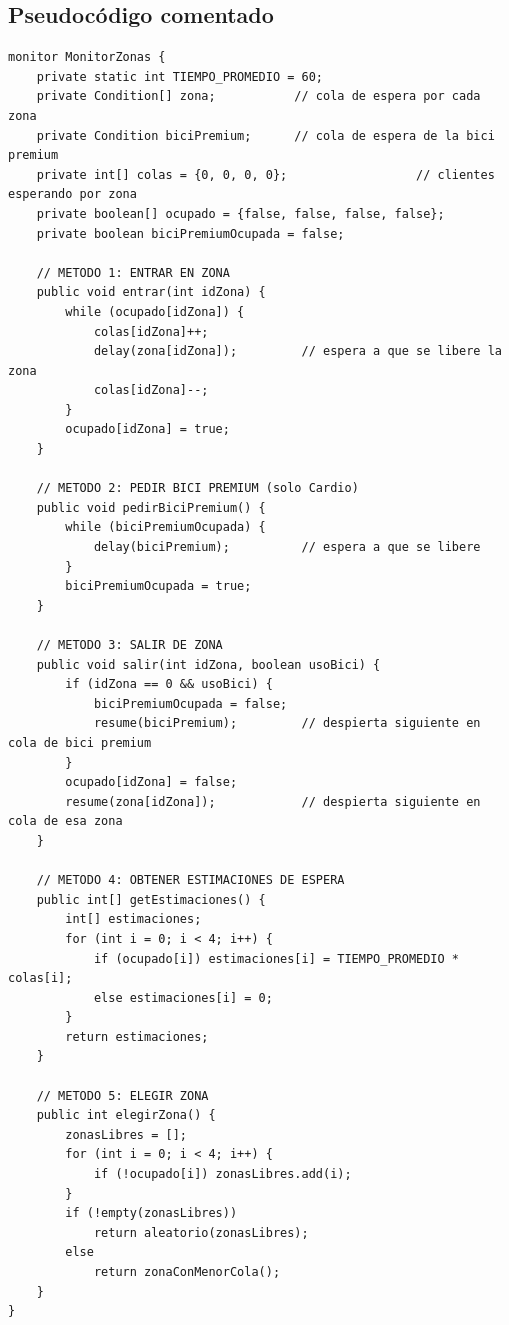 \documentclass[12pt,a4paper]{article}
\begin{document}
\subsection{Pseudocódigo comentado}

\begin{lstlisting}[language={}, caption={Pseudocódigo MonitorZonas}]
monitor MonitorZonas {
    private static int TIEMPO_PROMEDIO = 60;
    private Condition[] zona;           // cola de espera por cada zona
    private Condition biciPremium;      // cola de espera de la bici premium
    private int[] colas = {0, 0, 0, 0};                  // clientes esperando por zona
    private boolean[] ocupado = {false, false, false, false};
    private boolean biciPremiumOcupada = false;

    // METODO 1: ENTRAR EN ZONA
    public void entrar(int idZona) {
        while (ocupado[idZona]) {
            colas[idZona]++;
            delay(zona[idZona]);         // espera a que se libere la zona
            colas[idZona]--;
        }
        ocupado[idZona] = true;
    }

    // METODO 2: PEDIR BICI PREMIUM (solo Cardio)
    public void pedirBiciPremium() {
        while (biciPremiumOcupada) {
            delay(biciPremium);          // espera a que se libere
        }
        biciPremiumOcupada = true;
    }

    // METODO 3: SALIR DE ZONA
    public void salir(int idZona, boolean usoBici) {
        if (idZona == 0 && usoBici) {
            biciPremiumOcupada = false;
            resume(biciPremium);         // despierta siguiente en cola de bici premium
        }
        ocupado[idZona] = false;
        resume(zona[idZona]);            // despierta siguiente en cola de esa zona
    }

    // METODO 4: OBTENER ESTIMACIONES DE ESPERA
    public int[] getEstimaciones() {
        int[] estimaciones;
        for (int i = 0; i < 4; i++) {
            if (ocupado[i]) estimaciones[i] = TIEMPO_PROMEDIO * colas[i];
            else estimaciones[i] = 0;
        }
        return estimaciones;
    }

    // METODO 5: ELEGIR ZONA
    public int elegirZona() {
        zonasLibres = [];
        for (int i = 0; i < 4; i++) {
            if (!ocupado[i]) zonasLibres.add(i);
        }
        if (!empty(zonasLibres))
            return aleatorio(zonasLibres);
        else
            return zonaConMenorCola();
    }
}
\end{lstlisting}
\end{document}
